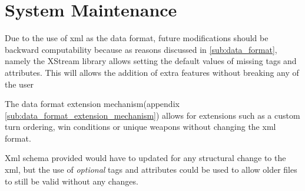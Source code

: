 \section{System Maintenance}

Due to the use of xml as the data format, future modifications should be backward computability because as reasons discussed in \ref{sub:data_format}, namely the XStream library allows setting the default values of missing tags and attributes. This will allows the addition of extra features without breaking any of the user 

The data format extension mechanism(appendix \ref{sub:data_format_extension_mechanism}) allows for extensions such as a custom turn ordering, win conditions or unique weapons without changing the xml format.

Xml schema provided would have to updated for any structural change to the xml, but the use of \emph{optional} tags and attributes could be used to allow older files to still be valid without any changes. 

